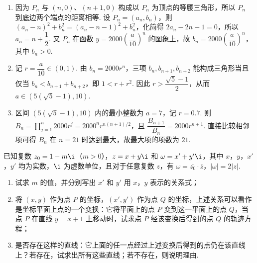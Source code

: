 \begin{solution}
\begin{enumerate}
\item 因为 \(P_n\) 与 \((n,0)\)、\((n+1,0)\) 构成以 \(P_n\) 为顶点的等腰三角形，所以 \(P_n\) 到底边两个端点的距离相等. 设 \(P_n=(a_n,b_n)\)，则
\((a_n-n)^2+b_n^2=(a_n-n-1)^2+b_n^2\)，化简得 \(2a_n-2n-1=0\)，所以 \(a_n=n+\dfrac{1}{2}\). 又 \(P_n\) 在函数 \(y=2000\left(\dfrac{a}{10}\right)^n\) 的图象上，故
\(b_n=2000\left(\dfrac{a}{10}\right)^n\)，其中 \(b_n>0\).
\item 记 \(r=\dfrac{a}{10}\in(0,1)\). 由 \(b_n=2000r^n\)，三项 \(b_n,b_{n+1},b_{n+2}\) 能构成三角形当且仅当 \(b_n<b_{n+1}+b_{n+2}\)，即 \(1<r+r^2\). 因此 \(r>\dfrac{\sqrt5-1}{2}\)，从而 \(a\in\left(5(\sqrt5-1),10\right)\).
\item 区间 \(\left(5(\sqrt5-1),10\right)\) 内的最小整数为 \(a=7\)，记 \(r=0.7\). 则 \(B_n=\prod_{j=1}^{n}2000r^j=2000^n r^{n(n+1)/2}\)，且 \(\dfrac{B_{n+1}}{B_n}=2000r^{n+1}\). 直接比较相邻项可得 \(B_n\) 在 \(n=21\) 时达到最大，故最大项的项数为 \(21\).
\end{enumerate}
\end{solution}

\begin{problem}
已知复数 \( z_0 = 1 - m\i \)（\( m > 0\)），\( z = x + y\i \) 和 \( \omega = x' + y'\i \)，其中 \(x\)，\(y\)，\(x'\)，\(y'\) 均为实数，\(\i\) 为虚数单位，且对于任意复数 \( z \)，有 \(\omega = \overline{z_0}\cdot\overline{z}\)，\(|\omega| = 2|z|\).
\begin{enumerate}
\item 试求 \(m\) 的值，并分别写出 \(x'\) 和 \(y'\) 用 \(x\)，\(y\) 表示的关系式；
\item 将 \((x, y)\) 作为点 \(P\) 的坐标，\((x', y')\) 作为点 \(Q\) 的坐标，上述关系可以看作是坐标平面上点的一个变换：它将平面上的点 \(P\) 变到这一平面上的点 \(Q\)，当点 \(P\) 在直线 \(y = x + 1\) 上移动时，试求点 \(P\) 经该变换后得到的点 \(Q\) 的轨迹方程；
\item 是否存在这样的直线：它上面的任一点经过上述变换后得到的点仍在该直线上？若存在，试求出所有这些直线；若不存在，则说明理由.
\end{enumerate}
\end{problem}

